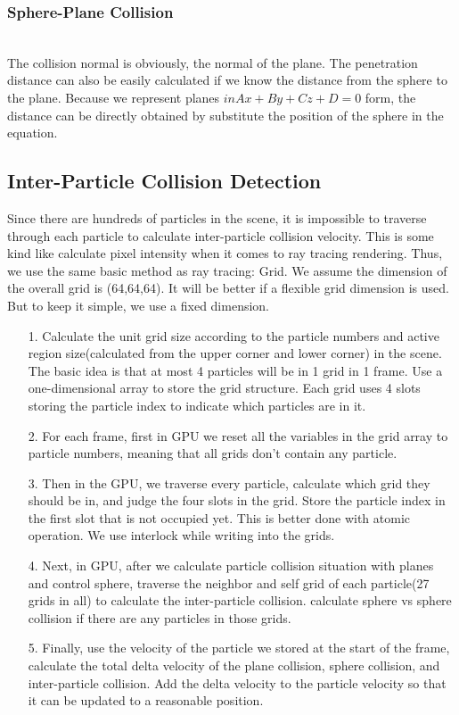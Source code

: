 \documentclass[acmtog]{acmart}
\begin{document}
\subsubsection{Sphere-Plane Collision}
\quad \\
The collision normal is obviously, the normal of the plane. The penetration distance can also be easily calculated if we know the distance from the sphere to the plane. Because we represent planes $in Ax+By+Cz+D = 0$ form, the distance can be directly obtained by substitute the position of the sphere in the equation.
\subsection{Inter-Particle Collision Detection}
Since there are hundreds of particles in the scene, it is impossible to traverse through each particle to calculate inter-particle collision velocity. This is some kind like calculate pixel intensity when it comes to ray tracing rendering. Thus, we use the same basic method as ray tracing: Grid. We assume the dimension of the overall grid is (64,64,64). It will be better if a flexible grid dimension is used. But to keep it simple, we use a fixed dimension.

\begin{enumerate}
	\item [1.] Calculate the unit grid size according to the particle numbers and active region size(calculated from the upper corner and lower corner) in the scene. The basic idea is that at most 4 particles will be in 1 grid in 1 frame. Use a one-dimensional array to store the grid structure. Each grid uses 4 slots storing the particle index to indicate which particles are in it.
	\item [2.] For each frame, first in GPU we reset all the variables in the grid array to particle numbers, meaning that all grids don't contain any particle. 
	\item [3.] Then in the GPU, we traverse every particle, calculate which grid they should be in, and judge the four slots in the grid. Store the particle index in the first slot that is not occupied yet. This is better done with atomic operation. We use interlock while writing into the grids.
	\item [4.] Next, in GPU, after we calculate particle collision situation with planes and control sphere, traverse the neighbor and self grid of each particle(27 grids in all) to calculate the inter-particle collision. calculate sphere vs sphere collision if there are any particles in those grids. 
	\item [5.] Finally, use the velocity of the particle we stored at the start of the frame, calculate the total delta velocity of the plane collision, sphere collision, and inter-particle collision. Add the delta velocity to the particle velocity so that it can be updated to a reasonable position. 
\end{enumerate}
\end{document}
